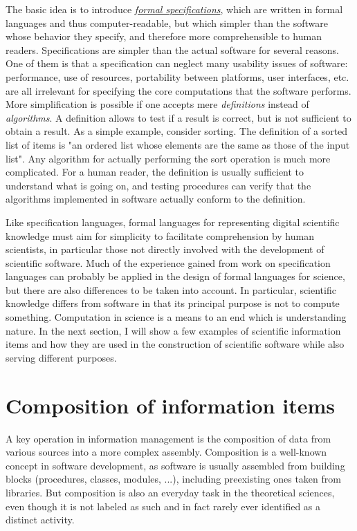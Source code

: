 The basic idea is to introduce \href{https://en.wikipedia.org/wiki/Formal_specification}{\textit{formal specifications}}, which are written in formal languages and thus computer-readable, but which simpler than the software whose behavior they specify, and therefore more comprehensible to human readers. Specifications are simpler than the actual software for several reasons. One of them is that a specification can neglect many usability issues of software: performance, use of resources, portability between platforms, user interfaces, etc. are all irrelevant for specifying the core computations that the software performs. More simplification is possible if one accepts mere \textit{definitions} instead of \textit{algorithms}. A definition allows to test if a result is correct, but is not sufficient to obtain a result. As a simple example, consider sorting. The definition of a sorted list of items is "an ordered list whose elements are the same as those of the input list". Any algorithm for actually performing the sort operation is much more complicated. For a human reader, the definition is usually sufficient to understand what is going on, and testing procedures can verify that the algorithms implemented in software actually conform to the definition.

Like specification languages, formal languages for representing digital scientific knowledge must aim for simplicity to facilitate comprehension by human scientists, in particular those not directly involved with the development of scientific software. Much of the experience gained from work on specification languages can probably be applied in the design of formal languages for science, but there are also differences to be taken into account. In particular, scientific knowledge differs from software in that its principal purpose is not to compute something. Computation in science is a means to an end which is understanding nature. In the next section, I will show a few examples of scientific information items and how they are used in the construction of scientific software while also serving different purposes.

\section{Composition of information items}
\label{composition}

A key operation in information management is the composition of data from various sources into a more complex assembly. Composition is a well-known concept in software development, as software is usually assembled from building blocks (procedures, classes, modules, ...), including preexisting ones taken from libraries. But composition is also an everyday task in the theoretical sciences, even though it is not labeled as such and in fact rarely ever identified as a distinct activity.

